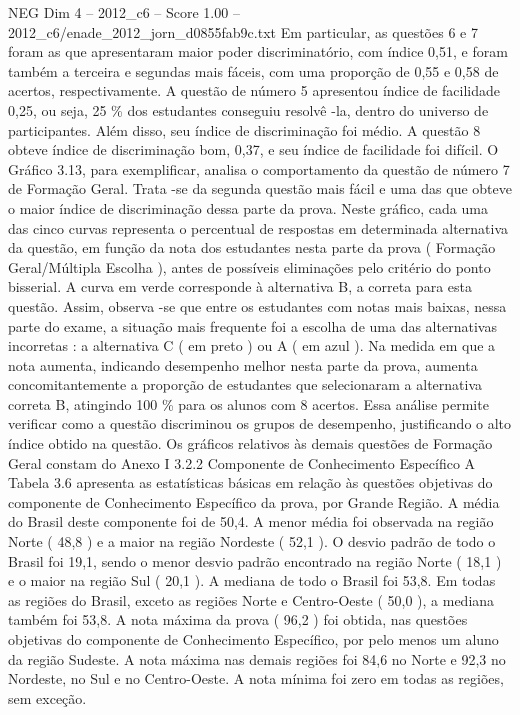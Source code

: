 \begin{textsample}{NEG Dim 4 – 2012\_c6 – Score 1.00 – 2012\_c6/enade\_2012\_jorn\_d0855fab9c.txt}
Em particular, as questões 6 e 7 foram as que apresentaram maior poder discriminatório, com índice 0,51, e foram também a terceira e segundas mais fáceis, com uma proporção de 0,55 e 0,58 de acertos, respectivamente.
A questão de número 5 apresentou índice de facilidade 0,25, ou seja, 25 \% dos estudantes conseguiu resolvê -la, dentro do universo de participantes.
Além disso, seu índice de discriminação foi médio.
A questão 8 obteve índice de discriminação bom, 0,37, e seu índice de facilidade foi difícil.
O Gráfico 3.13, para exemplificar, analisa o comportamento da questão de número 7 de Formação Geral.
Trata -se da segunda questão mais fácil e uma das que obteve o maior índice de discriminação dessa parte da prova.
Neste gráfico, cada uma das cinco curvas representa o percentual de respostas em determinada alternativa da questão, em função da nota dos estudantes nesta parte da prova ( Formação Geral/Múltipla Escolha ), antes de possíveis eliminações pelo critério do ponto bisserial.
A curva em verde corresponde à alternativa B, a correta para esta questão.
Assim, observa -se que entre os estudantes com notas mais baixas, nessa parte do exame, a situação mais frequente foi a escolha de uma das alternativas incorretas : a alternativa C ( em preto ) ou A ( em azul ).
Na medida em que a nota aumenta, indicando desempenho melhor nesta parte da prova, aumenta concomitantemente a proporção de estudantes que selecionaram a alternativa correta B, atingindo 100 \% para os alunos com 8 acertos.
Essa análise permite verificar como a questão discriminou os grupos de desempenho, justificando o alto índice obtido na questão.
Os gráficos relativos às demais questões de Formação Geral constam do Anexo I 3.2.2 Componente de Conhecimento Específico A Tabela 3.6 apresenta as estatísticas básicas em relação às questões objetivas do componente de Conhecimento Específico da prova, por Grande Região.
A média do Brasil deste componente foi de 50,4.
A menor média foi observada na região Norte ( 48,8 ) e a maior na região Nordeste ( 52,1 ).
O desvio padrão de todo o Brasil foi 19,1, sendo o menor desvio padrão encontrado na região Norte ( 18,1 ) e o maior na região Sul ( 20,1 ).
A mediana de todo o Brasil foi 53,8.
Em todas as regiões do Brasil, exceto as regiões Norte e Centro-Oeste ( 50,0 ), a mediana também foi 53,8.
A nota máxima da prova ( 96,2 ) foi obtida, nas questões objetivas do componente de Conhecimento Específico, por pelo menos um aluno da região Sudeste.
A nota máxima nas demais regiões foi 84,6 no Norte e 92,3 no Nordeste, no Sul e no Centro-Oeste.
A nota mínima foi zero em todas as regiões, sem exceção.

\end{textsample}
